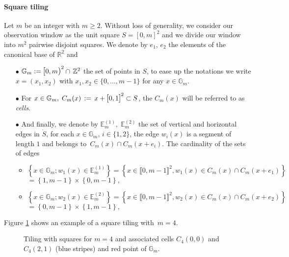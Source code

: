 \documentclass[12pt]{article}
\theoremstyle{Theorem}
\theoremstyle{definition}
\begin{document}
\paragraph{Square tiling}
Let $m$ be an integer with $m \geq 2$. Without loss of generality, we consider our observation window as the unit square $S = [0,m]^{2}$ and  we divide our window into $m^{2}$ pairwise disjoint squares. We denote by $e_1$, $e_{2}$ the elements of the canonical base of $\mathbb{R}^{2}$ and 
\begin{itemize}
 \item[$\bullet$] $\mathbb{G}_{m} := \text{\larger[1]{$[$}}0, m \text{\larger[1]{$)$}}^{2} \cap \, \mathbb{Z}^{2}$ the set of points in $S$, to ease up the notations we write $x = (x_1, x_2)$ with $x_1, x_2 \in \{0,\ldots, m-1\}$ for any $x\in \mathbb{G}_{m}$.
 \item[$\bullet$] For $x\in \mathbb{G}_{m}, \; C_{m}(x) \, := \,x + \text{\larger[1]{$[$}}0, 1 \text{\larger[1]{$]$}}^{2} \subset S$, the $C_{m}(x)$ will be referred to as \textit{cells}.
\item[$\bullet$] And finally, we denote by  $\mathbb{E}^{(1)}_{m}, \; \mathbb{E}^{(2)}_{m} $ the set of vertical and horizontal edges in $\mathring{S}$, for each $x \in \mathbb{G}_{m}$,  $i \in \{1, 2\}$, the edge $w_{i}(x)$ is a segment of length $1$ and belongs to~$C_{m}(x) \cap C_{m}(x+e_{i})$. The cardinality of the sets of edges
\begin{itemize}
\item 
$\left\{ x \in \mathbb{G}_{m}; w_{1}(x) \in \mathbb{E}^{\scriptscriptstyle  (1)}_{m}\right\} = \left\{x \in \llbracket 0, m-1 \rrbracket^{2}, w_{1}(x) \in C_{m}(x) \cap C_{m}(x+e_{1})\right\} $\\ 
 \hspace*{4.25cm}$ =  \left\{ 1, m - 1\right\}\times\left\{ 0, m-1 \right\},$
\item$\left\{ x \in \mathbb{G}_{m}; w_{2}(x) \in \mathbb{E}^{\scriptscriptstyle  (2)}_{m}\right\}  = \left\{x \in \llbracket 0, m-1 \rrbracket^{2}, w_{2}(x) \in C_{m}(x) \cap C_{m}(x+e_{2}) \right\} $\\ 
 \hspace*{4.25cm}$ = \left\{ 0, m-1 \right\} \times \left\{ 1, m - 1\right\},$
\end{itemize}
\end{itemize}
Figure \ref{figure1} shows an example of a square tiling with~$m = 4$.
\begin{figure}[h]
\begin{center}
\end{center}
\vspace{-0.25cm}
\caption{Tiling with squares for $m = 4$ and associated cells $C_{4}(0,0)$ and $C_{4}(2,1)$ (blue stripes) and red point of $\mathbb{G}_{m}$.}
\label{figure1}
\end{figure}
\end{document}
